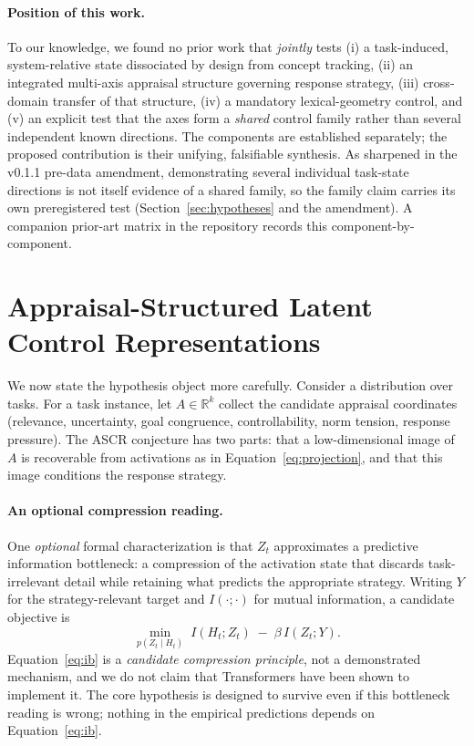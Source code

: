 \documentclass[11pt]{article}
\newcommand{\ascr}{ASCR}
\newcommand{\Hstate}{H_t}
\newcommand{\Zstate}{Z_t}
\begin{document}
\paragraph{Position of this work.}
To our knowledge, we found no prior work that \emph{jointly} tests (i) a
task-induced, system-relative state dissociated by design from concept tracking,
(ii) an integrated multi-axis appraisal structure governing response strategy,
(iii) cross-domain transfer of that structure, (iv) a mandatory lexical-geometry
control, and (v) an explicit test that the axes form a \emph{shared} control family
rather than several independent known directions. The components are established
separately; the proposed contribution is their unifying, falsifiable synthesis. As
sharpened in the v0.1.1 pre-data amendment, demonstrating several individual
task-state directions is not itself evidence of a shared family, so the family claim
carries its own preregistered test (Section~\ref{sec:hypotheses} and the amendment).
A companion prior-art matrix in the repository records this component-by-component.

\section{Appraisal-Structured Latent Control Representations}
\label{sec:ascr}

We now state the hypothesis object more carefully. Consider a distribution over
tasks. For a task instance, let $A \in \mathbb{R}^{k}$ collect the candidate
appraisal coordinates (relevance, uncertainty, goal congruence, controllability,
norm tension, response pressure). The \ascr{} conjecture has two parts: that a
low-dimensional image of $A$ is recoverable from activations as in
Equation~\eqref{eq:projection}, and that this image conditions the response
strategy.

\paragraph{An optional compression reading.}
One \emph{optional} formal characterization is that $\Zstate$ approximates a
predictive information bottleneck: a compression of the activation state that
discards task-irrelevant detail while retaining what predicts the appropriate
strategy. Writing $Y$ for the strategy-relevant target and $I(\cdot;\cdot)$ for
mutual information, a candidate objective is
\begin{equation}
\min_{p(\Zstate\mid \Hstate)}\; I(\Hstate;\Zstate)\;-\;\beta\, I(\Zstate;Y).
\label{eq:ib}
\end{equation}
Equation~\eqref{eq:ib} is a \emph{candidate compression principle}, not a
demonstrated mechanism, and we do not claim that Transformers have been shown to
implement it. The core hypothesis is designed to survive even if this bottleneck
reading is wrong; nothing in the empirical predictions depends on
Equation~\eqref{eq:ib}.
\end{document}
